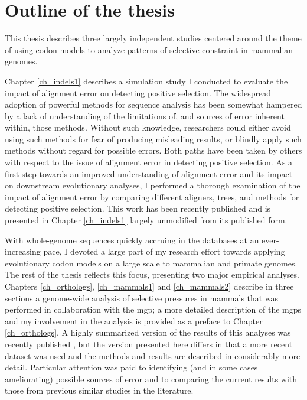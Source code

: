 \section{Outline of the thesis}

This thesis describes three largely independent studies centered
around the theme of using codon models to analyze patterns of
selective constraint in mammalian genomes.

Chapter \ref{ch_indels1} describes a simulation study I conducted to
evaluate the impact of alignment error on detecting \sw positive
selection. The widespread adoption of powerful methods for sequence
analysis has been somewhat hampered by a lack of understanding of the
limitations of, and sources of error inherent within, those
methods. Without such knowledge, researchers could either avoid using
such methods for fear of producing misleading results, or blindly
apply such methods without regard for possible errors. Both paths have
been taken by others with respect to the issue of alignment error in
detecting positive selection. As a first step towards an improved
understanding of alignment error and its impact on downstream
evolutionary analyses, I performed a thorough examination of the
impact of alignment error by comparing different aligners, trees, and
methods for detecting positive selection. This work has been recently
published \citep{Jordan2011} and is presented in Chapter
\ref{ch_indels1} largely unmodified from its published form.

With whole-genome sequences quickly accruing in the databases at an
ever-increasing pace, I devoted a large part of my research effort
towards applying evolutionary codon models on a large scale to
mammalian and primate genomes. The rest of the thesis reflects this
focus, presenting two major empirical analyses. Chapters
\ref{ch_orthologs}, \ref{ch_mammals1} and \ref{ch_mammals2} describe
in three sections a genome-wide analysis of \sw selective pressures in
mammals that was performed in collaboration with the \acf{mgp}; a more
detailed description of the \acp{mgp} and my involvement in the
analysis is provided as a preface to Chapter \ref{ch_orthologs}. A
highly summarized version of the results of this analyses was recently
published \citep{LindbladToh2011}, but the version presented here
differs in that a more recent dataset was used and the methods and
results are described in considerably more detail. Particular
attention was paid to identifying (and in some cases ameliorating)
possible sources of error and to comparing the current results with
those from previous similar studies in the literature.

